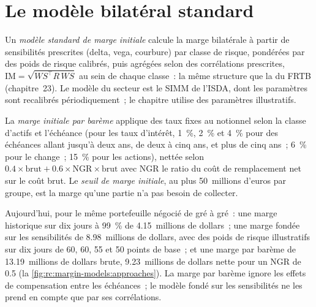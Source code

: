\section{Le modèle bilatéral standard}

\begin{definition}\label{def:rc:margin-models:simm}
Un \emph{modèle standard de marge initiale} calcule la marge bilatérale
à partir de sensibilités prescrites (delta, vega, courbure) par classe de risque, pondérées par des poids de risque
calibrés, puis agrégées selon des corrélations prescrites, $\mathrm{IM} = \sqrt{WS^\top R\,WS}$ au sein de chaque classe~: la
même structure que la  du FRTB (chapitre~23). Le modèle du secteur est le SIMM de l'ISDA,
dont les paramètres sont recalibrés périodiquement~; le chapitre utilise des paramètres illustratifs.
\end{definition}

\begin{definition}\label{def:rc:margin-models:schedule}
La \emph{marge initiale par barème} applique des taux fixes
au notionnel selon la classe d'actifs et l'échéance (pour les taux d'intérêt, 1~\%, 2~\% et 4~\% pour des échéances allant jusqu'à deux ans, de deux
à cinq ans, et plus de cinq ans~; 6~\% pour le change~; 15~\% pour les actions), nettée selon $0.4\times\text{brut}+0.6\times\mathrm{NGR}\times\text{brut}$
avec NGR le ratio du coût de remplacement net sur le coût brut. Le \emph{seuil de
marge initiale}, au plus 50~millions d'euros par groupe, est la marge qu'une partie
n'a pas besoin de collecter.
\end{definition}

\begin{example}\label{ex:rc:margin-models:bilateral}
Aujourd'hui, pour le même portefeuille négocié de gré à gré~: une marge historique sur dix jours à 99~\% de 4.15~millions de dollars~; une
marge fondée sur les sensibilités de 8.98~millions de dollars, avec des poids de risque illustratifs sur dix jours de 60, 60, 55 et 50
points de base~; et une marge par barème de 13.19~millions de dollars brute, 9.23~millions de dollars nette pour un NGR de 0.5
(la \cref{fig:rc:margin-models:approaches}). La marge par barème ignore les effets de compensation entre les échéances~; le
modèle fondé sur les sensibilités ne les prend en compte que par ses corrélations.
\end{example}

